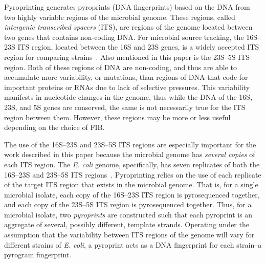 \documentclass[12pt]{ucthesis}
\begin{document}
      Pyroprinting generates pyroprints (DNA fingerprints) based on the DNA
      from two highly variable regions of the microbial genome. These regions,
      called \textit{intergenic transcribed spacers} (ITS), are regions of the
      genome located between two genes that contains non-coding DNA. For
      microbial source tracking, the 16S--23S ITS region, located between the
      16S and 23S genes, is a widely accepted ITS region for comparing
      strains~\cite{Boyer:ITS, Roth:Phylo, Tyler:Primers}. Also mentioned in
      this paper is the 23S--5S ITS region. Both of these regions of DNA are
      non-coding, and thus are able to accumulate more variability, or
      mutations, than regions of DNA that code for important proteins or RNAs
      due to lack of selective pressures. This variability manifests in
      nucleotide changes in the genome, thus while the DNA of the 16S, 23S, and
      5S genes are conserved, the same is not necessarily true for the ITS
      region between them. However, these regions may be more or less useful
      depending on the choice of FIB.
      
      The use of the 16S--23S and 23S--5S ITS regions are especially important
      for the work described in this paper because the microbial genome has
      \textit{several copies} of each ITS region. The \textit{E. coli} genome,
      specifically, has seven replicates of both the 16S--23S and 23S--5S ITS
      regions~\cite{Boyer:ITS, Roth:Phylo, Tyler:Primers}. Pyroprinting relies
      on the use of each replicate of the target ITS region that exists in the
      microbial genome. That is, for a single microbial isolate, each copy of
      the 16S--23S ITS region is pyrosequenced together, and each copy of the
      23S--5S ITS region is pyrosequenced together. Thus, for a microbial
      isolate, two \textit{pyroprints} are constructed such that each pyroprint is
      an aggregate of several, possibly different, template strands. Operating
      under the assumption that the variability between ITS regions of the
      genome will vary for different strains of \textit{E. coli}, a pyroprint
      acts as a DNA fingerprint for each strain--a pyrogram fingerprint.
      
\end{document}
